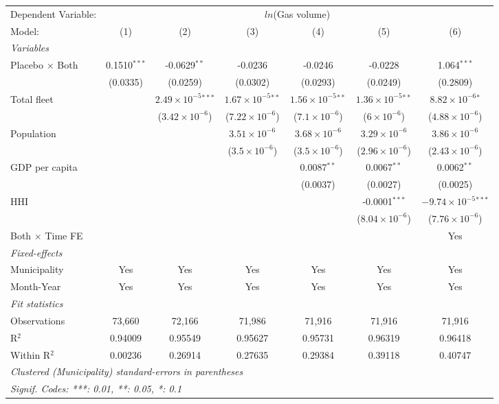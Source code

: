 \documentclass[
]{article}
\begin{document}
\begin{tabular}{lcccccc}
\tabularnewline\midrule\midrule
Dependent Variable:&\multicolumn{6}{c}{$ln$(Gas volume)}\\
Model:&(1) & (2) & (3) & (4) & (5) & (6)\\
\midrule \emph{Variables}&   &   &   &   &   &  \\
Placebo $\times $ Both & 0.1510$^{***}$ & -0.0629$^{**}$ & -0.0236 & -0.0246 & -0.0228 & 1.064$^{***}$\\
  &(0.0335) & (0.0259) & (0.0302) & (0.0293) & (0.0249) & (0.2809)\\
Total fleet &    & $2.49\times 10^{-5}$$^{***}$ & $1.67\times 10^{-5}$$^{**}$ & $1.56\times 10^{-5}$$^{**}$ & $1.36\times 10^{-5}$$^{**}$ & $8.82\times 10^{-6}$$^{*}$\\
  &   & ($3.42\times 10^{-6}$) & ($7.22\times 10^{-6}$) & ($7.1\times 10^{-6}$) & ($6\times 10^{-6}$) & ($4.88\times 10^{-6}$)\\
Population &    &    & $3.51\times 10^{-6}$ & $3.68\times 10^{-6}$ & $3.29\times 10^{-6}$ & $3.86\times 10^{-6}$\\
  &   &    & ($3.5\times 10^{-6}$) & ($3.5\times 10^{-6}$) & ($2.96\times 10^{-6}$) & ($2.43\times 10^{-6}$)\\
GDP per capita &    &    &    & 0.0087$^{**}$ & 0.0067$^{**}$ & 0.0062$^{**}$\\
  &   &    &    & (0.0037) & (0.0027) & (0.0025)\\
HHI &    &    &    &    & -0.0001$^{***}$ & $-9.74\times 10^{-5}$$^{***}$\\
  &   &    &    &    & ($8.04\times 10^{-6}$) & ($7.76\times 10^{-6}$)\\
Both $\times$ Time FE &  &  &  &  &  & Yes\\
\midrule \emph{Fixed-effects}&   &   &   &   &   &  \\
Municipality & Yes & Yes & Yes & Yes & Yes & Yes\\
Month-Year & Yes & Yes & Yes & Yes & Yes & Yes\\
\midrule \emph{Fit statistics}&  & & & & & \\
Observations & 73,660&72,166&71,986&71,916&71,916&71,916\\
R$^2$ & 0.94009&0.95549&0.95627&0.95731&0.96319&0.96418\\
Within R$^2$ & 0.00236&0.26914&0.27635&0.29384&0.39118&0.40747\\
\midrule\midrule\multicolumn{7}{l}{\emph{Clustered (Municipality) standard-errors in parentheses}}\\
\multicolumn{7}{l}{\emph{Signif. Codes: ***: 0.01, **: 0.05, *: 0.1}}\\
\end{tabular}
\end{document}
